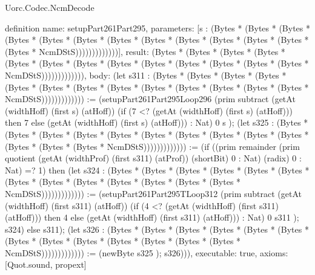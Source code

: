 \begin{lexlean}{Uorc.Codec.NcmDecode}
\begin{semanticmodule}
definition{
  name: setupPart261Part295,
  parameters: [s : (Bytes * (Bytes * (Bytes * (Bytes * (Bytes * (Bytes * (Bytes * (Bytes * (Bytes * (Bytes * (Bytes * (Bytes * (Bytes * NcmDStS)))))))))))))],
  result: (Bytes * (Bytes * (Bytes * (Bytes * (Bytes * (Bytes * (Bytes * (Bytes * (Bytes * (Bytes * (Bytes * (Bytes * (Bytes * NcmDStS))))))))))))),
  body: (let s311 : (Bytes * (Bytes * (Bytes * (Bytes * (Bytes * (Bytes * (Bytes * (Bytes * (Bytes * (Bytes * (Bytes * (Bytes * (Bytes * NcmDStS))))))))))))) := (setupPart261Part295Loop296 (prim subtract (getAt (widthHoff) (first s) (atHoff)) (if (7 <? (getAt (widthHoff) (first s) (atHoff))) then 7 else (getAt (widthHoff) (first s) (atHoff))) : Nat) 0 s ); (let s325 : (Bytes * (Bytes * (Bytes * (Bytes * (Bytes * (Bytes * (Bytes * (Bytes * (Bytes * (Bytes * (Bytes * (Bytes * (Bytes * NcmDStS))))))))))))) := (if ((prim remainder (prim quotient (getAt (widthProf) (first s311) (atProf)) (shortBit) 0 : Nat) (radix) 0 : Nat) =? 1) then (let s324 : (Bytes * (Bytes * (Bytes * (Bytes * (Bytes * (Bytes * (Bytes * (Bytes * (Bytes * (Bytes * (Bytes * (Bytes * (Bytes * NcmDStS))))))))))))) := (setupPart261Part295TLoop312 (prim subtract (getAt (widthHoff) (first s311) (atHoff)) (if (4 <? (getAt (widthHoff) (first s311) (atHoff))) then 4 else (getAt (widthHoff) (first s311) (atHoff))) : Nat) 0 s311 ); s324) else s311); (let s326 : (Bytes * (Bytes * (Bytes * (Bytes * (Bytes * (Bytes * (Bytes * (Bytes * (Bytes * (Bytes * (Bytes * (Bytes * (Bytes * NcmDStS))))))))))))) := (newByte s325 ); s326))),
  executable: true,
  axioms: [Quot.sound, propext]
}


\end{semanticmodule}
\end{lexlean}
